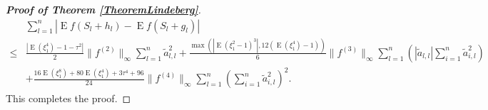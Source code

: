 \documentclass[11pt]{article}
\DeclareMathOperator{\myE}{E}
\theoremstyle{plain}
\theoremstyle{definition}
\theoremstyle{remark}
\begin{document}
\begin{proof}[\textbf{Proof of Theorem \ref{TheoremLindeberg}}]
    \begin{equation*}
        \begin{split}
             &
             \sum_{l=1}^n \left| \myE f(S_{l}+h_{l})-\myE f(S_{l}+g_{l})\right|
             \\
\leq&
\frac{
\left|
\myE (\xi_1^4)-1
            -
            \tau^2
\right|
}{2}
\|f^{(2)}\|_\infty
\sum_{l=1}^n \tilde a_{l,l}^2
            +
            \frac{
            \max\left(
    \left|\myE (\xi_1^2-1)^3\right|
            ,
12 (\myE (\xi_1^4)-1)
        \right)
            }{6} \|f^{(3)}\|_\infty
            \sum_{l=1}^n 
            \left(|\tilde a_{l,l}|
         \sum_{i=1}^{n} \tilde a_{i,l}^2 
     \right)
         \\
            &+
            \frac{
             16 \myE (\xi_1^8) + 80 \myE (\xi_1^4) + 3\tau^4 + 96 
            }{24} \|f^{(4)} \|_{\infty} 
            \sum_{l=1}^n \left( \sum_{i=1}^n \tilde a_{i,l}^2 \right)^2
            .
        \end{split}
    \end{equation*}
    This completes the proof.
 
\end{proof}
\end{document}
